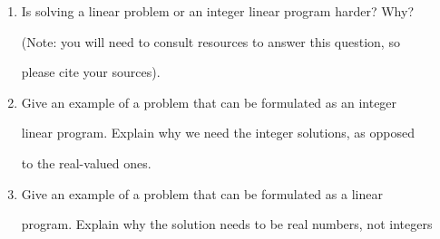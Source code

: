 \documentclass{article}
\begin{document}
\begin{enumerate}

    \item Is solving a linear problem or an integer linear program harder?  Why?

        (Note: you will need to consult resources to answer this question, so

        please cite your sources).

    \item Give an example of a problem that can be formulated as an integer

        linear program.  Explain why we need the integer solutions, as opposed

        to the real-valued ones.

    \item Give an example of a problem that can be formulated as a linear

        program.  Explain why the solution needs to be real numbers, not integers
\end{enumerate}
\end{document}
